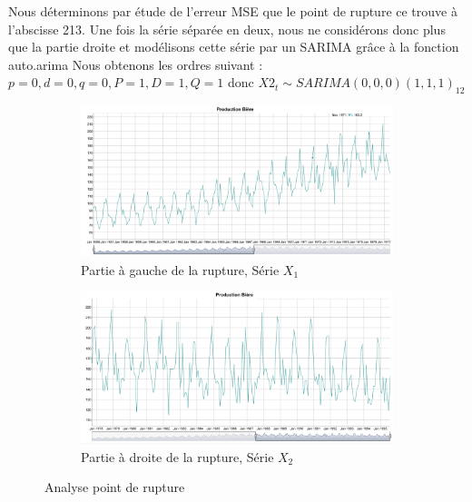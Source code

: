 \documentclass[12pt,a4paper]{book}
\newcommand{\1}{\mathds{1}}
\begin{document}
\vspace{5 mm}
Nous déterminons par étude de l'erreur MSE que le point de rupture ce trouve à l'abscisse 213. Une fois la série séparée en deux, nous ne considérons donc plus que la partie droite et modélisons cette série par un SARIMA grâce à la fonction auto.arima
Nous obtenons les ordres suivant : $p=0,d=0,q=0,P=1,D=1,Q=1$ 
donc $X2_t \sim SARIMA(0,0,0)(1,1,1)_{12}$

\begin{figure}[h]
	\begin{subfigure}{.5\textwidth}
  		\centering
    	\includegraphics[scale=0.2]{rupture1}  
    	\caption{Partie à gauche de la rupture, Série $X_1$}
    	\label{fig:sub1}
    \end{subfigure}
    \begin{subfigure}{.5\textwidth}
    	\centering
    	\includegraphics[scale=0.2]{rupture2}  
    	\caption{Partie à droite de la rupture, Série $X_2$}
    	\label{fig:sub2}
    \end{subfigure}

\caption{Analyse point de rupture}
\label{fig:1}
   
\end{figure}
\end{document}
